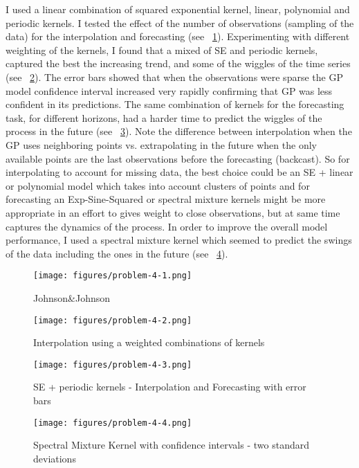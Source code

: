 \documentclass[12pt]{article}
\begin{document}
I used a linear combination of squared exponential kernel, linear, polynomial and periodic kernels. 
I tested the effect of the number of observations (sampling of the data) for the interpolation and forecasting (see ~\ref{problem41}).
Experimenting with different weighting of the kernels, I found that a mixed of  SE and periodic kernels, captured the best the increasing trend, and some of the wiggles of the time series (see  ~\ref{problem42}).
The error bars showed that when the observations were sparse the GP model confidence interval increased very rapidly confirming that GP was less confident in its predictions.
The same combination of kernels for the forecasting task, for different horizons, had a harder time to predict the wiggles of the process in the future (see  ~\ref{problem43}). 
Note the difference between interpolation when the GP uses neighboring points vs. extrapolating in the future when the only available points are the last observations before the forecasting (backcast). 
So for interpolating to account for missing data, the best choice could be an SE + linear or polynomial model which takes into account clusters of points and for forecasting an Exp-Sine-Squared  or spectral mixture kernels might be more appropriate
in an effort to gives weight to close observations, but at same time captures the dynamics of the process.
In order to improve the overall model performance, I used a spectral mixture kernel which seemed to predict the swings of the data including the ones in the future (see  ~\ref{problem44}).

\begin{figure}
	\centering
	\texttt{[image: figures/problem-4-1.png]} 
	\caption{Johnson\&Johnson}
	\label{problem41}
\end{figure}
\begin{figure}
	\centering
	\texttt{[image: figures/problem-4-2.png]} 
	\caption{Interpolation using a weighted combinations of kernels}
	\label{problem42}
\end{figure}
\begin{figure}
	\centering
	\texttt{[image: figures/problem-4-3.png]} 
	\caption{SE + periodic kernels - Interpolation and Forecasting with error bars}
	\label{problem43}
\end{figure}
\begin{figure}
	\centering
	\texttt{[image: figures/problem-4-4.png]} 
	\caption{Spectral Mixture Kernel with confidence intervals - two standard deviations}
	\label{problem44}
\end{figure}
\end{document}
